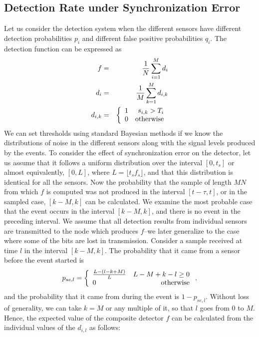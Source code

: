 \subsection{Detection Rate under Synchronization Error}
Let us consider the detection system when the different sensors have different detection probabilities $p_i$ and different false positive probabilities $q_i$. The detection function can be expressed as
\begin{eqnarray}
  f &=& {1\over N}\sum_{i=1}^Md_i \nonumber\\
  d_i &=& {1\over M}\sum_{k=1}^Md_{i,k}\label{eqn:heterog_detector}\\
  d_{i,k}&=& \left\{\begin{array}{lr}
  1 & s_{i,k}>T_i\\
  0 & {\rm otherwise}\end{array}\right.\nonumber
\end{eqnarray}
We can set thresholds using standard Bayesian methods if we know the distributions of noise in the different sensors along with the signal levels produced by the events. To consider the effect of synchronization error on the detector, let us assume that it follows a uniform distribution over the interval $[0,t_s]$ or almost equivalently, $[0,L]$, where $L=\lfloor t_sf_s\rfloor$, and that this distribution is identical for all the sensors. Now the probability that the sample of length $MN$ from which $f$ is computed was not produced in the interval $[t-\tau,t]$, or in the sampled case, $[k-M,k]$ can be calculated. We examine the most probable case that the event occurs in the interval $[k-M,k]$, and there is no event in the preceding interval. We assume that all detection results from individual sensors are transmitted to the node which produces $f$--we later generalize to the case where some of the bits are lost in transmission. Consider a sample received at time $l$ in the interval $[k-M,k]$. The probability that it came from a sensor before the event started is
\begin{equation}
  p_{se,l} = \left\{\begin{array}{lr}
  {L-(l-k+M) \over L}  & L-M+k-l\geq 0\\
  0 & {\rm otherwise}\end{array}\right.\label{eqn:syncerrorprob},
\end{equation}
and the probability that it came from during the event is $1-p_{se,l}$. Without loss of generality, we can take $k=M$ or any multiple of it, so that $l$ goes from $0$ to $M$. Hence, the expected value of the composite detector $f$ can be calculated from the individual values of the $d_{i,l}$ as follows:
